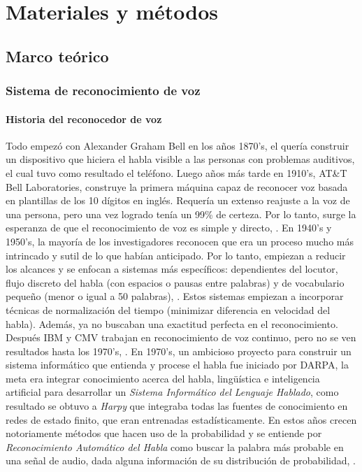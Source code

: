 \chapter{Materiales y métodos}
\section{Marco teórico}
\subsection{Sistema de reconocimiento de voz}

\subsubsection{Historia del reconocedor de voz}
Todo empezó con Alexander Graham Bell en los años 1870’s, el quería construir un dispositivo que hiciera el habla visible a las personas con problemas auditivos, el cual tuvo como resultado el teléfono. Luego años más tarde en 1910’s, AT\&T Bell Laboratories, construye la primera máquina capaz de reconocer voz basada en plantillas de los 10 dígitos en inglés. Requería un extenso reajuste a la voz de una persona, pero una vez logrado tenía un 99\% de certeza. Por lo tanto, surge la esperanza de que el reconocimiento de voz es simple y directo, \citep{eyra}.
\vskip 0.5cm
En 1940’s y 1950’s, la mayoría de los investigadores reconocen que era un proceso mucho más intrincado y sutil de lo que habían anticipado. Por lo tanto, empiezan a reducir los alcances y se enfocan a sistemas más específicos: dependientes del locutor, flujo discreto del habla (con espacios o pausas entre palabras) y de vocabulario pequeño (menor o igual a 50 palabras), \citep{eyra}.
\vskip 0.5cm
Estos sistemas empiezan a incorporar técnicas de normalización del tiempo (minimizar diferencia en velocidad del habla). Además, ya no buscaban una exactitud perfecta en el reconocimiento. Después IBM y CMV trabajan en reconocimiento de voz continuo, pero no se ven resultados hasta los 1970’s, \citep{eyra}.
\vskip 0.5cm
En 1970’s, un ambicioso proyecto para construir un sistema informático que entienda y procese el habla fue iniciado por DARPA, la meta era integrar conocimiento acerca del habla, lingüística e inteligencia artificial para desarrollar un \textit{Sistema Informático del Lenguaje Hablado}, como resultado se obtuvo a \textit{Harpy} que integraba todas las fuentes de conocimiento en redes de estado finito, que eran entrenadas estadísticamente. En estos años crecen notoriamente métodos que hacen uso de la probabilidad y se entiende por \textit{Reconocimiento Automático del Habla} como buscar la palabra más probable en una señal de audio, dada alguna información de su distribución de probabilidad, \citep{orlando}.
